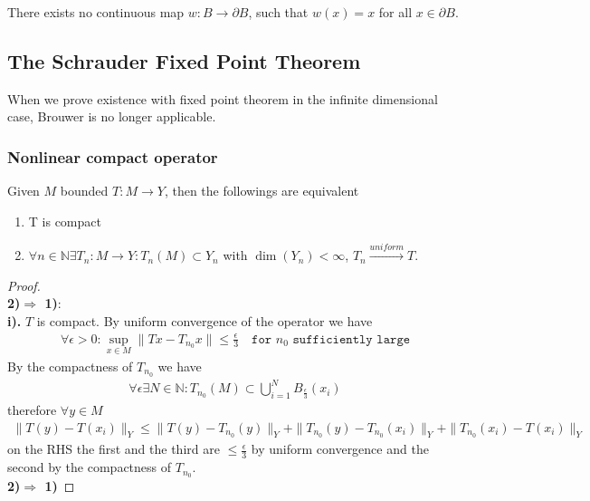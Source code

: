 \begin{lemma}
	There exists no continuous map $ w: B \rightarrow \partial B$, such that $w(x) = x$ for all $x \in \partial B$. 
\end{lemma}



\subsection{The Schrauder Fixed Point Theorem}
When we prove existence with fixed point theorem in the infinite dimensional case, Brouwer is no longer applicable. 

\subsubsection{Nonlinear compact operator }
\begin{proposition}
Given $M$ bounded $T: M \rightarrow Y$, then the followings are equivalent
\begin{enumerate}
	\item T is compact
	\item $\forall n \in \mathbb{N} \exists T_n : M \rightarrow Y: T_n(M) \subset Y_n$ with $\dim (Y_n) < \infty$, $T_n \overset{uniform}{\rightarrow} T$. 
\end{enumerate}
\end{proposition}
\begin{proof}\quad\\
\textbf{2)$\Rightarrow$ 1)}: \\
\textbf{i).} $T$ is compact. By uniform convergence of the operator we have
\begin{align*}
	\forall \epsilon > 0: \sup_{x \in M} \|Tx - T_{n_0}x \| \le \frac{\epsilon}{3} \quad \texttt{for $n_0$ sufficiently large}
\end{align*}
By the compactness of $T_{n_0}$ we have
\begin{align*}
	\forall \epsilon  \exists N \in \mathbb{N}: T_{n_0}(M) \subset \bigcup_{i = 1}^N B_{\frac{\epsilon}{3}} (x_i)
\end{align*}
therefore $\forall y \in M$
\begin{align*}
	\|T( y) - T(x_i)\|_Y \le \|T(y) - T_{n_0} (y)\|_Y + \|T_{n_0}(y) - T_{n_0}(x_i)\|_Y + \|T_{n_0}(x_i) - T(x_i)\|_Y
\end{align*}
on the RHS the first and the third are $\le \frac{\epsilon}{3}$ by uniform convergence and the second by the compactness of $T_{n_0}$. \\
\textbf{2)$ \Rightarrow$ 1)} 
\end{proof}



